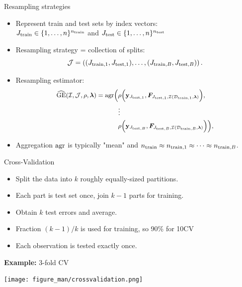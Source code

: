 \documentclass[11pt,compress,t,notes=noshow, xcolor=table]{beamer}
\begin{document}

\begin{vbframe}{Resampling strategies}
\footnotesize
\begin{itemize}
  \item Represent train and test sets by index
  vectors:\\ 
  $\Jtrain \in \nset^{\ntrain}$ and $\Jtest
  \in \nset^{\ntest}$
  \item Resampling strategy = collection of splits:
  $$\JJ = \JJset.$$
  \item Resampling estimator:  
\begin{equation*}
\small
\begin{split}
\GEhresa = \agr\Big(
 &\rho\Big(\yv_{\Jtesti[1]}, \FJtestftraini[1]\Big), \\ &\large{\vdots} \\
& \rho\Big(\yv_{\Jtesti[B]}, \FJtestftraini[B]\Big)
    \Big),
\end{split}
\end{equation*}
\item Aggregation $\agr$ is typically "mean" and $\ntrain \approx \ntraini[1] \approx \dots \approx \ntraini[B]$.
\end{itemize}

\end{vbframe}


\begin{vbframe}{Cross-Validation}

\begin{itemize}
  \item Split the data into $k$ roughly equally-sized partitions.
  \item Each part is test set once, join $k-1$ parts for training.
  \item Obtain $k$ test errors and average.
  \item Fraction $(k-1)/k$ is used for training, so 90\% for 10CV
  \item Each observation is tested exactly once.
\end{itemize}

\lz

\textbf{Example:} 3-fold CV

\begin{center}
\texttt{[image: figure\_man/crossvalidation.png]}
\end{center}
\end{vbframe}
\end{document}
